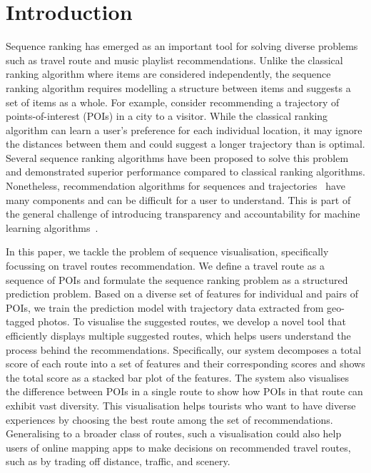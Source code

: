 
\section{Introduction}
Sequence ranking has emerged as an important tool for solving diverse problems such as travel route and music playlist recommendations. 
Unlike the classical ranking algorithm where items are considered independently, the sequence ranking algorithm requires modelling a structure between items and suggests a set of items as a whole. 
For example, consider recommending a trajectory of points-of-interest (POIs) in a city to a visitor. 
While the classical ranking algorithm can learn a user's preference for each individual location, it may ignore the distances between them and could suggest a longer trajectory than is optimal. 
Several sequence ranking algorithms have been proposed to solve this problem and demonstrated superior performance compared to classical ranking algorithms. 
Nonetheless, recommendation algorithms for sequences and trajectories~\cite{chen2016learning,chen2017SR} have many components and can be difficult for a user to understand. This is part of the general challenge of introducing transparency and accountability for machine learning algorithms~\cite{fatml}. 

In this paper, we tackle the problem of sequence visualisation, specifically focussing on travel routes recommendation. 
We define a travel route as a sequence of POIs and formulate the sequence ranking problem as a structured prediction problem. 
Based on a diverse set of features for individual and pairs of POIs, we train the prediction model with trajectory data extracted from geo-tagged photos. 
To visualise the suggested routes, we develop a novel tool that efficiently displays multiple suggested routes, which helps users understand the process behind the recommendations.
Specifically, our system decomposes a total score of each route into a set of features and their corresponding scores and shows the total score as a stacked bar plot of the features.
The system also visualises the difference between POIs in a single route to show how POIs in that route can exhibit vast diversity. 
This visualisation helps tourists who want to have diverse experiences by choosing the best route among the set of recommendations. Generalising to a broader class of routes, such a visualisation could also help users of online mapping apps to make decisions on recommended travel routes, such as by trading off distance, traffic, and scenery. 

